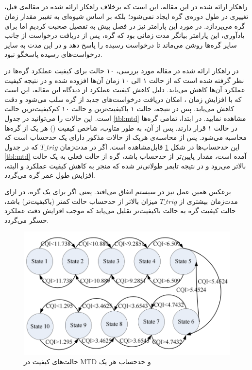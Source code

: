 \subsection{}
راهکار ارائه شده در این مقاله\cite{}، این است که برخلاف راهکار ارائه شده در مقاله‌ی قبل، تغییری در طول دوره‌ی گره ایجاد نمی‌شود؛ بلکه بر اساس شیوه‌ای به تغییر مقدار زمان  گره می‌پردازد. در مورد این پارامتر نیز در فصل پیش به تفصیل صحبت کردیم اما برای یادآوری، این پارامتر بیانگر مدت زمانی بود که گره، پس از دریافت درخواست از جانب سایر گره‌ها روشن می‌ماند تا درخواست رسیده را پاسخ دهد و در این مدت به سایر درخواست‌های رسیده پاسخگو نبود.
\par
در راهکار ارائه شده در مقاله مورد بررسی، ۱۰ حالت برای کیفیت عملکرد گره‌ها در نظر گرفته شده است که از حالت ۱ الی ۱۰ زمان  آن‌ها افزوده شده و در نتیجه کیفیت عملکرد آن‌ها کاهش می‌یابد. دلیل کاهش کیفیت عملکرد از دیدگاه این مقاله، این است که با افزایش زمان ، امکان دریافت درخواست‌های جدید از گره سلب می‌شود و دقت کاهش می‌یابد. پس در نتیجه، حالت ۱ باکیفیت‌ترین و حالت ۱۰ کم‌کیفیت‌ترین حالت است. این حالات را می‌توانید در جدول \ref{tbl:mtd} مشاهده نمایید. در ابتدا، تمامی گره‌ها در حالت ۱ قرار دارند. پس از آن‌، به طور متاوب، شاخص کیفیت () هر یک از گره‌ها محاسبه می‌شود.
پس از محاسبه‌ی  هریک از حالات مذکور دارای یک حدحساب  است که این حدحساب‌ها در شکل \ref{fig:mtd} قابل‌مشاهده است. اگر در مدت‌زمان $T\_trig$ که در جدول \ref{tbl:mtd} آمده است، مقدار  پایین‌تر از حدحساب باشد، گره از حالت فعلی به یک حالت بالاتر می‌رود و در نتیجه تایمر طولانی‌تر شده که منجر به کاهش کیفیت عملکرد و البته، افزایش طول عمر گره می‌گردد.
\par
برعکس همین عمل نیز در سیستم اتفاق می‌افتد. یعنی اگر برای یک گره، در ازای مدت‌زمان بیشتری از $T\_trig$ میزان  بالاتر از حدحساب حالت کمتر (باکیفیت‌تر) باشد، حالت کیفیت گره به حالت باکیفیت‌تر تقلیل می‌یابد که موجب افزایش دقت عملکرد حسگر می‌گردد.

\begin{figure}
	\centering
	\includegraphics[width=0.7\linewidth]{figs/mtd}
	\caption {حالت‌های کیفیت در MTD و حدحساب هر یک}
	\label{fig:mtd}
\end{figure}

